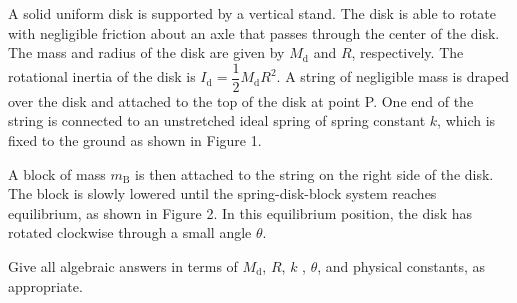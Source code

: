 \documentclass{../../../oss-apphys-exam}
\begin{document}
\begin{questions}
  \newpage
  
  
  \question A solid uniform disk is supported by a vertical stand. The disk is
  able to rotate with negligible friction about an axle that passes through the
  center of the disk. The mass and radius of the disk are given by $M_\text{d}$
  and $R$, respectively. The rotational inertia of the disk is
  $I_\text{d}=\dfrac12 M_\text{d}R^2$. A string of negligible mass is draped over
  the disk and attached to the top of the disk at point P. One end of the
  string is connected to an unstretched ideal spring of spring constant $k$,
  which is fixed to the ground as shown in Figure 1.
  
  \vspace{.2in}A block of mass $m_\text{B}$ is then attached to the string on
  the right side of the disk. The block is slowly lowered until the
  spring-disk-block system reaches equilibrium, as shown in Figure 2. In this
  equilibrium position, the disk has rotated clockwise through a small angle
  $\theta$.

  \vspace{.2in}Give all algebraic answers in terms of $M_\text{d}$, $R$, $k$ ,
  $\theta$, and physical constants, as appropriate.

\end{questions}
\end{document}
